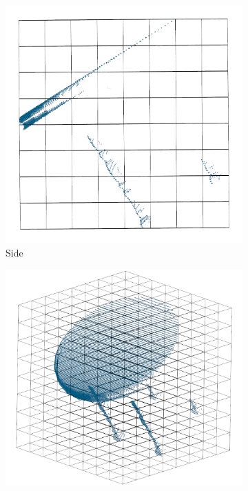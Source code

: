 \begin{figure}[!ht]
\begin{subfigure}{0.325\textwidth}
		\includegraphics[width=\linewidth]{Figures/ObjRecog/fixed_side}
		\caption{Side}
		\label{subfig:objrecog:fixed:side}
	\end{subfigure}
	\hfill
	\begin{subfigure}{0.325\textwidth}
		\centering
		\includegraphics[width=\linewidth]{Figures/ObjRecog/fixed_persp}

\end{subfigure}
\end{figure}

